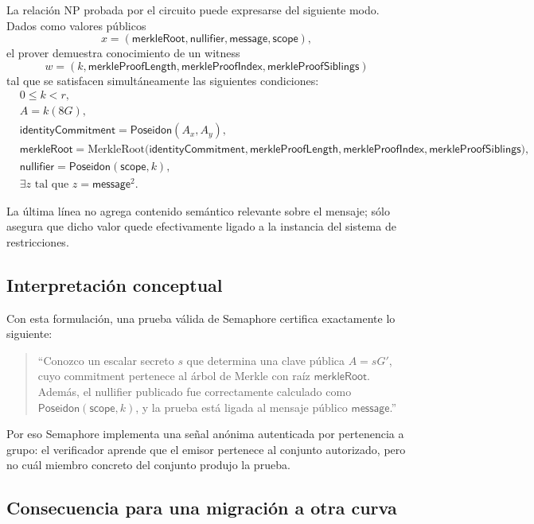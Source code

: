 \documentclass[11pt,a4paper]{article}
\begin{document}
	La relación NP probada por el circuito puede expresarse del siguiente modo. Dados como valores públicos
	\[
	x = (\mathsf{merkleRoot}, \mathsf{nullifier}, \mathsf{message}, \mathsf{scope}),
	\]
	el prover demuestra conocimiento de un witness
	\[
	w = (k,\mathsf{merkleProofLength},\mathsf{merkleProofIndex},\mathsf{merkleProofSiblings})
	\]
	tal que se satisfacen simultáneamente las siguientes condiciones:
	\begin{align*}
		& 0 \le k < r, \\
		& A = k(8G), \\
		& \mathsf{identityCommitment} = \mathsf{Poseidon}(A_x,A_y), \\
		& \mathsf{merkleRoot} =
		\mathrm{MerkleRoot}\bigl(\mathsf{identityCommitment},\mathsf{merkleProofLength},\mathsf{merkleProofIndex},\mathsf{merkleProofSiblings}\bigr), \\
		& \mathsf{nullifier} = \mathsf{Poseidon}(\mathsf{scope}, k), \\
		& \exists z \text{ tal que } z = \mathsf{message}^2.
	\end{align*}
	
	La última línea no agrega contenido semántico relevante sobre el mensaje; sólo asegura que dicho valor quede efectivamente ligado a la instancia del sistema de restricciones.
	
	\subsection{Interpretación conceptual}
	
	Con esta formulación, una prueba válida de Semaphore certifica exactamente lo siguiente:
	
	\begin{quote}
		``Conozco un escalar secreto \(s\) que determina una clave pública \(A=sG'\), cuyo commitment pertenece al árbol de Merkle con raíz \(\mathsf{merkleRoot}\). Además, el nullifier publicado fue correctamente calculado como \(\mathsf{Poseidon}(\mathsf{scope},k)\), y la prueba está ligada al mensaje público \(\mathsf{message}\).''
	\end{quote}
	
	Por eso Semaphore implementa una señal anónima autenticada por pertenencia a grupo: el verificador aprende que el emisor pertenece al conjunto autorizado, pero no cuál miembro concreto del conjunto produjo la prueba.
	
	\subsection{Consecuencia para una migración a otra curva}
	
\end{document}
